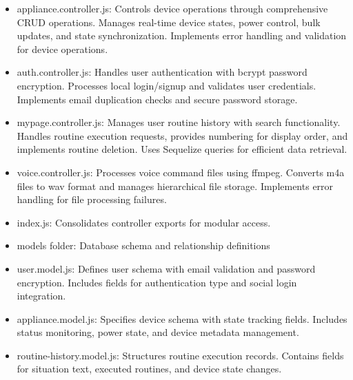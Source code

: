 \documentclass[conference]{IEEEtran}
\begin{document}
\begin{enumerate}[label=\arabic*]
\begin{itemize}[label=-]
        \item appliance.controller.js: Controls device operations through comprehensive CRUD operations. Manages real-time device states, power control, bulk updates, and state synchronization. Implements error handling and validation for device operations.
        \vspace{0.7em}

        \item auth.controller.js: Handles user authentication with bcrypt password encryption. Processes local login/signup and validates user credentials. Implements email duplication checks and secure password storage.
        \vspace{0.7em}

        \item mypage.controller.js: Manages user routine history with search functionality. Handles routine execution requests, provides numbering for display order, and implements routine deletion. Uses Sequelize queries for efficient data retrieval.
        \vspace{0.7em}

        \item voice.controller.js: Processes voice command files using ffmpeg. Converts m4a files to wav format and manages hierarchical file storage. Implements error handling for file processing failures.
        \vspace{0.7em}

        \item index.js: Consolidates controller exports for modular access.
        \vspace{0.7em}

        \item models folder: Database schema and relationship definitions
        \vspace{0.7em}

        \item user.model.js: Defines user schema with email validation and password encryption. Includes fields for authentication type and social login integration.
        \vspace{0.7em}

        \item appliance.model.js: Specifies device schema with state tracking fields. Includes status monitoring, power state, and device metadata management.
        \vspace{0.7em}

        \item routine-history.model.js: Structures routine execution records. Contains fields for situation text, executed routines, and device state changes.
        \vspace{0.7em}


\end{itemize}
\end{enumerate}
\end{document}

